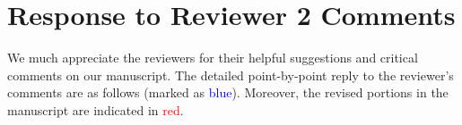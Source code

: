 \documentclass[preprint,12pt]{elsarticle}
\newenvironment{MyColorPar}[1]{%
    \leavevmode\color{#1}\ignorespaces%
}{%
}%
\begin{document}
\begin{MyColorPar}{blue}

\end{MyColorPar}
\pagebreak
\section*{Response to Reviewer 2 Comments}
We much appreciate the reviewers for their helpful suggestions and critical comments on our manuscript. The detailed point-by-point reply to the reviewer's comments are as follows (marked as \textcolor{blue}{blue}). 
Moreover, the revised portions in the manuscript are indicated in \textcolor{red}{red}.
\end{document}

